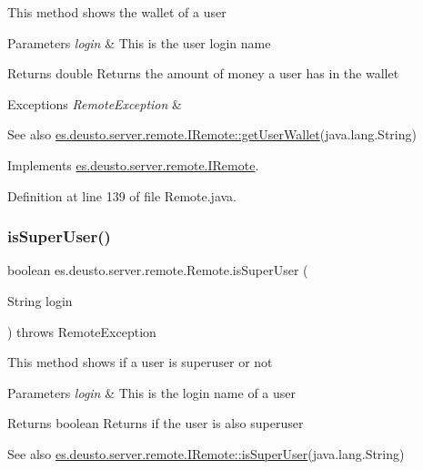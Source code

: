 This method shows the wallet of a user 
\begin{DoxyParams}{Parameters}
{\em login} & This is the user login name \\
\hline
\end{DoxyParams}
\begin{DoxyReturn}{Returns}
double Returns the amount of money a user has in the wallet 
\end{DoxyReturn}

\begin{DoxyExceptions}{Exceptions}
{\em Remote\+Exception} & \\
\hline
\end{DoxyExceptions}
\begin{DoxySeeAlso}{See also}
\hyperlink{interfacees_1_1deusto_1_1server_1_1remote_1_1_i_remote_a53305dbc72d910c932e66e2c27c5e1bb}{es.\+deusto.\+server.\+remote.\+I\+Remote\+::get\+User\+Wallet}(java.\+lang.\+String) 
\end{DoxySeeAlso}


Implements \hyperlink{interfacees_1_1deusto_1_1server_1_1remote_1_1_i_remote_a53305dbc72d910c932e66e2c27c5e1bb}{es.\+deusto.\+server.\+remote.\+I\+Remote}.



Definition at line 139 of file Remote.\+java.

\mbox{\label{classes_1_1deusto_1_1server_1_1remote_1_1_remote_ac7d2e76813b61b5a9fcf33d89b6e08c4}} 
\subsubsection{\texorpdfstring{is\+Super\+User()}{isSuperUser()}}
{\footnotesize\ttfamily boolean es.\+deusto.\+server.\+remote.\+Remote.\+is\+Super\+User (\begin{DoxyParamCaption}\item[{String}]{login }\end{DoxyParamCaption}) throws Remote\+Exception}

This method shows if a user is superuser or not 
\begin{DoxyParams}{Parameters}
{\em login} & This is the login name of a user \\
\hline
\end{DoxyParams}
\begin{DoxyReturn}{Returns}
boolean Returns if the user is also superuser 
\end{DoxyReturn}
\begin{DoxySeeAlso}{See also}
\hyperlink{interfacees_1_1deusto_1_1server_1_1remote_1_1_i_remote_a488f8b57271876e219af445345428d73}{es.\+deusto.\+server.\+remote.\+I\+Remote\+::is\+Super\+User}(java.\+lang.\+String) 
\end{DoxySeeAlso}


